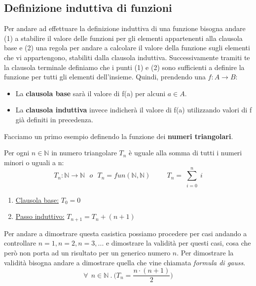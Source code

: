 \subsection{Definizione induttiva di funzioni}
Per andare ad effettuare la definizione induttiva di una funzione bisogna andare (1) a stabilire il valore delle funzioni per gli elementi appartenenti alla clausola base e (2) una regola per andare a calcolare il valore della funzione sugli elementi che vi appartengono, stabiliti dalla clausola induttiva. Successivamente tramiti te la clausola terminale definiamo che i punti (1) e (2) sono sufficienti a definire la funzione per tutti gli elementi dell'insieme. Quindi, prendendo una $f: A \longrightarrow B$:
\begin{itemize}
    \item La \textbf{clausola base} sarà il valore di f(a) per alcuni $a \in A$.
    \item La \textbf{clausola induttiva} invece indicherà il valore di f(a) utilizzando valori di f già definiti in precedenza.
\end{itemize}
\begin{example}
    Facciamo un primo esempio definendo la funzione dei \textbf{numeri triangolari}.
    \begin{definition}
        Per ogni $n \in \mathbb{N}$ in numero triangolare $T_n$ è uguale alla somma di tutti i numeri minori o uguali a n:
        \begin{equation}\label{numeri-triangolari}
            T_n: \mathbb{N} \longrightarrow \mathbb{N} \: \: \: o \: \: \: T_n = fun(\mathbb{N},\mathbb{N}) \hspace{1cm} T_n = \sum_{\substack{i=0}}^n i
        \end{equation}
    \end{definition}
    \begin{enumerate}
        \item \underline{Clausola base:} $T_0 = 0$
        \item \underline{Passo induttivo:} $T_{n + 1} = T_n + (n + 1)$
    \end{enumerate}
    Per andare a dimostrare questa casistica possiamo procedere per casi andando a controllare $n=1, n=2, n=3, ...$ e dimostrare la validità per questi casi, cosa che però non porta ad un risultato per un generico numero $n$. Per dimostrare la validità bisogna andare a dimostrare quella che vine chiamata \textit{formula di gauss}.
    \begin{equation}\label{formula-gauss}
        \forall\: \: n \in \mathbb{N} \: . \: \bigg(T_n = \frac{n \cdot (n + 1)}{2}\bigg)
    \end{equation}
\end{example}

